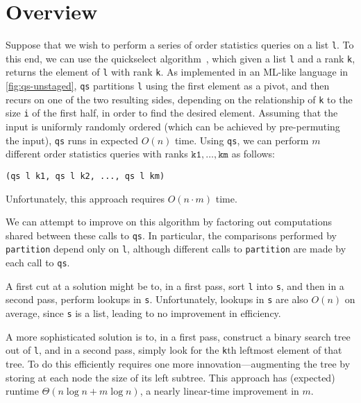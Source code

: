 
\section{Overview}
\label{sec:overview}

\begin{abstrsyn}



Suppose that we wish to perform a series of order statistics queries
on a list \texttt{l}. To this end, we can use the quickselect
algorithm~\cite{Hoare:1961}, which given a list \texttt{l} and a rank
\texttt{k}, returns the element of \texttt{l} with rank \texttt{k}.
As implemented in an ML-like language in \ref{fig:qs-unstaged},
\texttt{qs} partitions \texttt{l} using the first element as
a pivot, and then recurs on one of the two resulting sides, depending on
the relationship of \texttt{k} to the size \texttt{i} of the first half, in
order to find the desired element.  Assuming that the input is uniformly
randomly ordered (which can be achieved by pre-permuting the input), \texttt{qs}
runs in expected $O(n)$ time.
%
Using \texttt{qs}, we can perform $m$ different order statistics queries with
ranks $\mathtt{k1},\dots,\mathtt{km}$ as follows:
%
\begin{lstlisting}
(qs l k1, qs l k2, ..., qs l km)
\end{lstlisting}
%
Unfortunately, this approach requires $O(n \cdot m)$ time.

We can attempt to improve on this algorithm by factoring out computations shared
between these calls to \texttt{qs}. In particular, the comparisons performed by
\texttt{partition} depend only on \texttt{l}, although different calls to
\texttt{partition} are made by each call to \texttt{qs}.

A first cut at a solution might be to, in a first pass, sort \texttt{l} into
\texttt{s}, and then in a second pass, perform lookups in \texttt{s}.
Unfortunately, lookups in \texttt{s} are also $O(n)$ on average, since
\texttt{s} is a list, leading to no improvement in efficiency.  

A more sophisticated solution is to, in a first pass, construct a binary search
tree out of \texttt{l}, and in a second pass, simply look for the \texttt{k}th
leftmost element of that tree. To do this efficiently requires one more
innovation---augmenting the tree by storing at each node the size of its left
subtree. This approach has (expected) runtime $\Theta(n\log{n} + m\log{n})$, a
nearly linear-time improvement in $m$.


\end{abstrsyn}
